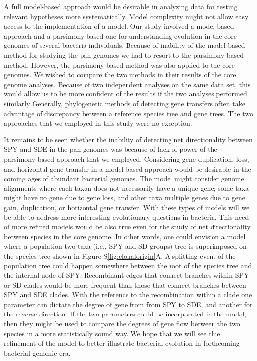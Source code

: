 \documentclass[10pt]{article}
\begin{document}
A full model-based approach would be desirable in analyzing data for testing
relevant hypotheses more systematically. Model complexity might not allow easy
access to the implementation of a model. Our study involved a model-based
approach and a parsimony-based one for understanding evolution in the core
genomes of several bacteria individuals. Because of inability of the model-based
method for studying the pan genomes we had to resort to the parsimony-based
method. However, the parsimony-based method was also applied to the core
genomes. We wished to compare the two methods in their results of the core
genome analyses.  Because of two independent analyses on the same data set, this
would allow us to be more confident of the results if the two analyses performed
similarly Generally, phylogenetic methods of detecting gene transfers often take
advantage of discrepancy between a reference species tree and gene trees. The
two approaches that we employed in this study were no exception. 

It remains to be seen whether the inability of detecting net directionality
between SPY and SDE in the pan genomes was because of lack of power of the
parsimony-based approach that we employed. Considering gene duplication, loss,
and horizontal gene transfer in a model-based approach would be desirable in the
coming ages of abundant bacterial genomes. The model might consider genome
alignments where each taxon does not necessarily have a unique gene; some taxa
might have no gene due to gene loss, and other taxa multiple genes due to gene
gain, duplication, or horizontal gene transfer. With these types of models will
we be able to address more interesting evolutionary questions in bacteria. This
need of more refined models would be also true even for the study of net
directionality between species in the core genome.  In other words, one could
envision a model where a population two-taxa (i.e., SPY and SD groups) tree is
superimposed on the species tree shown in Figure S\ref{fig:clonalorigin}A. A
splitting event of the population tree could happen somewhere between the root
of the species tree and the internal node of SPY. Recombinant edges that connect
branches within SPY or SD clades would be more frequent than those that connect
branches between SPY and SDE clades.  With the reference to the recombination
within a clade one parameter can dictate the degree of gene from from SPY to
SDE, and another for the reverse direction.  If the two parameters could be
incorporated in the model, then they might be used to compare the degrees of
gene flow between the two species in a more statistically sound way.  We hope
that we will see thie refinement of the model to better illustrate bacterial
evolution in forthcoming bacterial genomic era.
\end{document}
